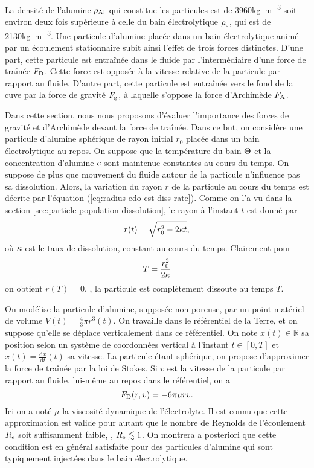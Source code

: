 La densité de l'alumine $\rho_\mathrm{Al}$ qui constitue les particules
est de \num{3960}\si{\kilo\gram\per\cubic\meter} soit environ deux
fois supérieure à celle du bain électrolytique $\rho_\mathrm{e}$,
qui est de \num{2130}\si{\kilo\gram\per\cubic\meter}. Une particule
d'alumine placée dans un bain électrolytique animé par un écoulement
stationnaire subit ainsi l'effet de trois forces
distinctes. D'une part, cette particule est entraînée dans le fluide
par l'intermédiaire d'une force de traînée $F_{\mathrm D}$. Cette force
est opposée à la vitesse relative de la particule par rapport au
fluide. D'autre part, cette particule est entraînée vers le fond de
la cuve par la force de gravité $F_{\mathrm g}$, à laquelle s'oppose
la force d'Archimède $F_{\mathrm A}$.

Dans cette section, nous nous proposons d'évaluer l'importance des
forces de gravité et d'Archimède devant la force de traînée. Dans ce
but, on considère une particule d'alumine sphérique de rayon initial
$r_0$ placée dans un bain électrolytique au repos. On suppose que la
température du bain $\Theta$ et la concentration d'alumine
$c$ sont maintenue constantes au cours du temps. On
suppose de plus que mouvement du fluide autour de la particule
n'influence pas sa dissolution. Alors, la variation du rayon $r$ de la
particule au cours du temps est décrite par l'équation
(\ref{eq:radius-edo-cst-diss-rate}). Comme on l'a vu dans la section
\ref{sec:particle-population-dissolution}, le rayon à l'instant $t$
est donné par
\begin{equation}\label{eq:radius}
  r(t) = \sqrt{r_0^2 - 2\kappa t},
\end{equation}
où $\kappa$ est le taux de dissolution, constant au cours du
temps. Clairement pour
\begin{equation}
  T = \frac{r_0^2}{2\kappa}
\end{equation}
on obtient $r(T) = 0$, \ie, la particule est complètement dissoute
au temps $T$.

On modélise la particule d'alumine, supposée non poreuse, par un point
matériel de volume $V(t) = \frac{4}{3}\pi r^3(t)$. On travaille dans
le référentiel de la Terre, et on suppose qu'elle se déplace
verticalement dans ce référentiel. On note $x(t)\in \mathbb R$ sa
position selon un système de coordonnées vertical à l'instant $t\in
[0,T]$ et $\dot x(t) = \frac{\mathrm dx}{\mathrm dt}(t)$ sa
vitesse. La particule étant sphérique, on propose d'approximer la
force de traînée par la loi de Stokes. Si $v$ est la vitesse de la
particule par rapport au fluide, lui-même au repos dans le
référentiel, on a
\begin{equation}
F_{\mathrm D}(r, v) = -6\pi\mu r v.
\end{equation}
Ici on a noté $\mu$ la viscosité dynamique de l'électrolyte. Il est
connu que cette approximation est valide pour autant que le nombre de
Reynolds de l'écoulement $R_{\mathrm e}$ soit suffisamment faible, \ie,
$R_{\mathrm e} \lesssim 1$. On montrera a posteriori que cette condition
est en général satisfaite pour des particules d'alumine qui sont
typiquement injectées dans le bain électrolytique.

